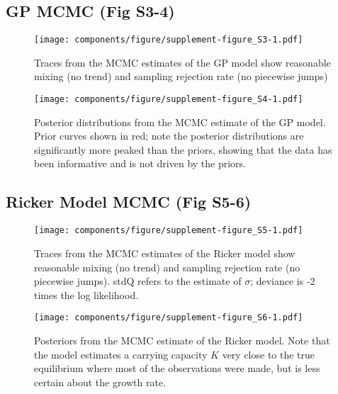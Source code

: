 \documentclass[]{components/elsarticle}
\begin{document}
\subsection{GP MCMC (Fig S3-4)}\label{gp-mcmc-fig-s3-4}

\begin{figure}[htbp]
\centering
\texttt{[image: components/figure/supplement-figure\_S3-1.pdf]}
\caption{Traces from the MCMC estimates of the GP model show reasonable
mixing (no trend) and sampling rejection rate (no piecewise jumps)}
\end{figure}

\begin{figure}[htbp]
\centering
\texttt{[image: components/figure/supplement-figure\_S4-1.pdf]}
\caption{Posterior distributions from the MCMC estimate of the GP model.
Prior curves shown in red; note the posterior distributions are
significantly more peaked than the priors, showing that the data has
been informative and is not driven by the priors.}
\end{figure}

\newpage
\newpage

\subsection{Ricker Model MCMC (Fig
S5-6)}\label{ricker-model-mcmc-fig-s5-6}

\begin{figure}[htbp]
\centering
\texttt{[image: components/figure/supplement-figure\_S5-1.pdf]}
\caption{Traces from the MCMC estimates of the Ricker model show
reasonable mixing (no trend) and sampling rejection rate (no piecewise
jumps). stdQ refers to the estimate of $\sigma$; deviance is -2 times
the log likelihood.}
\end{figure}

\begin{figure}[htbp]
\centering
\texttt{[image: components/figure/supplement-figure\_S6-1.pdf]}
\caption{Posteriors from the MCMC estimate of the Ricker model. Note
that the model estimates a carrying capacity $K$ very close to the true
equilibrium where most of the observations were made, but is less
certain about the growth rate.}
\end{figure}
\end{document}
